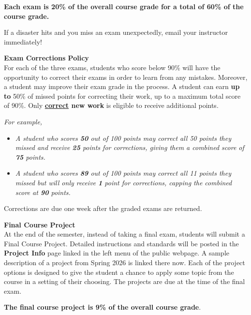 \documentclass[11pt]{article}
\renewcommand{\emph}[1]{\textsf{\textbf{#1}}}
\newcommand{\localhead}[1]{\par\smallskip\textbf{#1} \smallskip\nobreak\\}%
\def\heading#1{\localhead{\large\emph{#1}}}
\def\subheading#1{\localhead{\emph{#1}}}
\begin{document}
\emph{Each  exam is 20\% of the overall course grade for a total of 60\% of the course grade.}

If a disaster hits and you miss an exam unexpectedly, email your instructor immediately!

\subheading{Exam Corrections Policy}
For each of the three exams, students who score below 90\% will have the opportunity to correct their exams in order to learn from any mistakes. Moreover, a student may improve their exam grade in the process. A student can earn \emph{up to} 50\% of missed points for correcting their work, up to a maximum total score of 90\%. Only \emph{\underline{correct} new work} is eligible to receive additional points.
{\it For example,
\begin{itemize}
\item {\it A student who scores {\bf 50} out of 100 points may
correct all 50 points they missed and receive {\bf 25} points for
corrections, giving them a combined score of {\bf 75} points.}
\item {\it A student who scores {\bf 89} out of 100 points may
correct all 11 points they missed but will only receive {\bf 1} point
for corrections, capping the combined score at {\bf 90} points.}
\end{itemize}
}

Corrections are due one week after the graded exams are returned.

\heading{Final Course Project}
At the end of the semester, instead of taking a final exam, students will submit a Final
Course Project. Detailed instructions and standards will be posted in the \emph{Project Info} page linked in the left menu of the public webpage. A sample description of a project from Spring 2026 is linked there now. Each of the project options is designed to give the student a chance to apply some topic from the course in a setting of their choosing. The projects are due at the time of the final exam. 

\emph{The final course project is 9\% of the overall course grade}.
\end{document}
